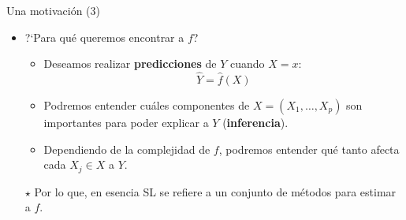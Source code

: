 \documentclass[usenames,dvipsnames]{beamer} %
\begin{document}
\begin{frame}{Una motivaci\'on (3)}
    \begin{itemize}
        \item ?`Para qu\'e queremos encontrar a $f$?
        \begin{itemize}
            \item Deseamos realizar \textbf{predicciones} de $Y$ cuando $X=x$:
            \begin{equation}\label{eq:1_pred}
                \hat{Y} = \hat{f}(X)
            \end{equation}
            \item Podremos entender cu\'ales componentes de $X=(X_1, \dots, X_p)$ son importantes para poder explicar a $Y$ (\textbf{inferencia}).
            \item Dependiendo de la complejidad de $f$, podremos entender qu\'e tanto afecta cada $X_j \in X$ a $Y$.
        \end{itemize}
        \item[$\star$] Por lo que, en esencia SL se refiere a un conjunto de m\'etodos para estimar a $f$.
    \end{itemize}
\end{frame}
\end{document}
